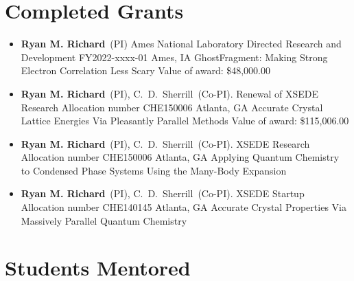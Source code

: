 \documentclass[11pt,a4paper,sans]{moderncv}
\begin{document}
\section{Completed Grants}
\vspace{5pt}
\begin{itemize}
	\item{
		{\textbf{Ryan M. Richard}\ (PI)}
		{Ames National Laboratory Directed Research and Development
         FY2022-xxxx-01}
		{Ames, IA}
		{}
		{GhostFragment: Making Strong Electron Correlation Less Scary}
		{Value of award: \$48,000.00}
		{}
	}
	\item{
          {\textbf{Ryan M. Richard}\ (PI), C.~D.~Sherrill\ (Co-PI).}
          {Renewal of XSEDE Research Allocation number CHE150006}
          {Atlanta, GA}
          {}
          {Accurate Crystal Lattice Energies Via Pleasantly Parallel Methods}
          {Value of award: \$115,006.00}
          {}}
	\item{
          {\textbf{Ryan M. Richard}\ (PI), C.~D.~Sherrill\ (Co-PI).}
          {XSEDE Research Allocation number CHE150006}
          {Atlanta, GA}
          {}
          {Applying Quantum Chemistry to Condensed Phase Systems Using the Many-Body Expansion}
          {}
          {}}
	\item{
          {\textbf{Ryan M. Richard}\ (PI), C.~D.~Sherrill\ (Co-PI).}
          {XSEDE Startup Allocation number CHE140145}
          {Atlanta, GA}
          {}
          {Accurate Crystal Properties Via Massively Parallel Quantum Chemistry}
          {}
          {}}
\end{itemize}

\section{Students Mentored}
\end{document}
